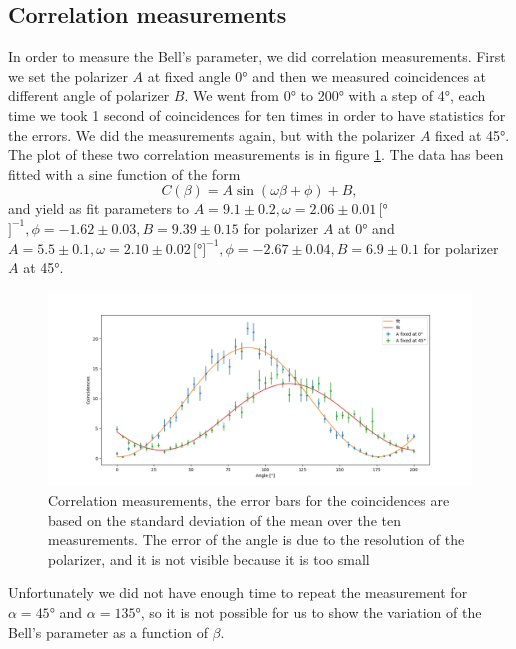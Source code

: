 \documentclass[a4paper,10pt]{article}
\begin{document}
\subsection{Correlation measurements}
In order to measure the Bell's parameter, we did correlation measurements. First we set the polarizer $A$ at fixed angle 0° and then we measured coincidences at different angle of polarizer $B$. We went from 0° to 200° with a step of 4°, each time we took 1 second of coincidences for ten times in order to have statistics for the errors. We did the measurements again, but with the polarizer $A$ fixed at 45°. The plot of these two correlation measurements is in figure \ref{correlation}. The data has been fitted with a sine function of the form
\[C(\beta) = A\sin(\omega\beta +\phi) +  B,\] 
and yield as fit parameters to $A = 9.1\pm 0.2,\omega= 2.06\pm0.01\,[$°$]^{-1} ,\phi=-1.62\pm0.03,B=9.39\pm0.15$ for polarizer $A$ at 0° and $A = 5.5\pm 0.1,\omega= 2.10\pm0.02\,[$°$]^{-1} ,\phi=-2.67\pm 0.04,B=6.9\pm0.1$ for polarizer $A$ at 45°.
\begin{figure}[H]
\hspace{-5em}
\includegraphics[width=1.2\textwidth]{img/correlation}
\caption{Correlation measurements, the error bars for the coincidences are based on the standard deviation of the mean over the ten measurements. The error of the angle is due to the resolution of the polarizer, and it is not visible because it is too small}\label{correlation}
\end{figure}
Unfortunately we did not have enough time to repeat the measurement for $\alpha = 45$° and $\alpha=135$°, so it is not possible for us to show the variation of the Bell's parameter as a function of $\beta$.
\end{document}
